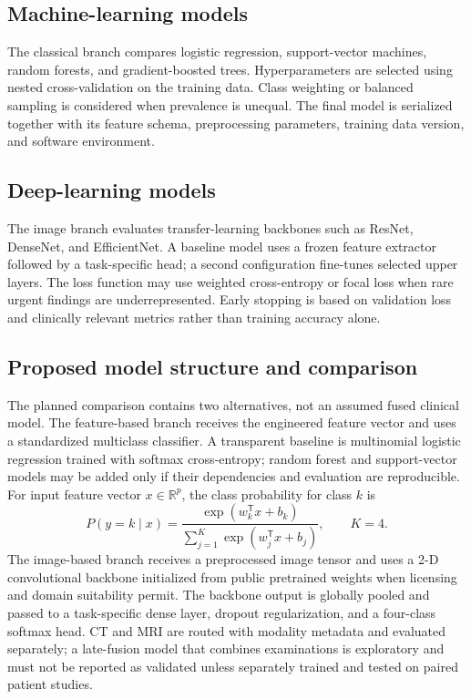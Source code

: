 \documentclass[10pt,a4paper]{article}
\begin{document}
\subsection{Machine-learning models}
The classical branch compares logistic regression, support-vector machines, random forests, and gradient-boosted trees. Hyperparameters are selected using nested cross-validation on the training data. Class weighting or balanced sampling is considered when prevalence is unequal. The final model is serialized together with its feature schema, preprocessing parameters, training data version, and software environment.

\subsection{Deep-learning models}
The image branch evaluates transfer-learning backbones such as ResNet, DenseNet, and EfficientNet. A baseline model uses a frozen feature extractor followed by a task-specific head; a second configuration fine-tunes selected upper layers. The loss function may use weighted cross-entropy or focal loss when rare urgent findings are underrepresented. Early stopping is based on validation loss and clinically relevant metrics rather than training accuracy alone.

\subsection{Proposed model structure and comparison}
The planned comparison contains two alternatives, not an assumed fused clinical model. The feature-based branch receives the engineered feature vector and uses a standardized multiclass classifier. A transparent baseline is multinomial logistic regression trained with softmax cross-entropy; random forest and support-vector models may be added only if their dependencies and evaluation are reproducible. For input feature vector $x\in\mathbb{R}^{p}$, the class probability for class $k$ is
\begin{equation}
P(y=k\mid x)=\frac{\exp(w_k^{\mathsf T}x+b_k)}{\sum_{j=1}^{K}\exp(w_j^{\mathsf T}x+b_j)},\qquad K=4.
\end{equation}
The image-based branch receives a preprocessed image tensor and uses a 2-D convolutional backbone initialized from public pretrained weights when licensing and domain suitability permit. The backbone output is globally pooled and passed to a task-specific dense layer, dropout regularization, and a four-class softmax head. CT and MRI are routed with modality metadata and evaluated separately; a late-fusion model that combines examinations is exploratory and must not be reported as validated unless separately trained and tested on paired patient studies.
\end{document}
